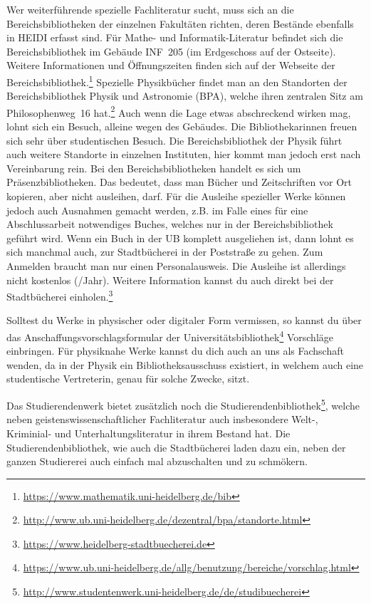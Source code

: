 Wer weiterführende spezielle Fachliteratur sucht, muss sich an die Bereichsbibliotheken der einzelnen Fakultäten richten, deren Bestände ebenfalls in \gls{HEIDI} erfasst sind. Für Mathe- und Informatik-Literatur befindet sich die Bereichsbibliothek im Gebäude \gls{INF}~205 (im Erdgeschoss auf der Ostseite). Weitere Informationen und Öffnungszeiten finden sich auf der Webseite der Bereichsbibliothek.\footnote{\url{https://www.mathematik.uni-heidelberg.de/bib}} Spezielle Physikbücher findet man an den Standorten der Bereichsbibliothek Physik und Astronomie (BPA), welche ihren zentralen Sitz am Philosophenweg~16 hat.\footnote{\url{http://www.ub.uni-heidelberg.de/dezentral/bpa/standorte.html}} Auch wenn die Lage etwas abschreckend wirken mag, lohnt sich ein Besuch, alleine wegen des Gebäudes. Die Bibliothekarinnen freuen sich sehr über studentischen Besuch. Die Bereichsbibliothek der Physik führt auch weitere Standorte in einzelnen Instituten, hier kommt man jedoch erst nach Vereinbarung rein.
Bei den Bereichsbibliotheken handelt es sich um Präsenzbibliotheken. Das bedeutet, dass man Bücher und Zeitschriften vor Ort kopieren, aber nicht ausleihen, darf. Für die Ausleihe spezieller Werke können jedoch auch Ausnahmen gemacht werden, z.B. im Falle eines für eine Abschlussarbeit notwendiges Buches, welches nur in der Bereichsbibliothek geführt wird.
Wenn ein Buch in der UB komplett ausgeliehen ist, dann lohnt es sich manchmal auch, zur Stadtbücherei in der Poststraße zu gehen. Zum Anmelden braucht man nur einen Personalausweis. Die Ausleihe ist allerdings nicht kostenlos (/Jahr). Weitere Information kannst du auch direkt bei der Stadtbücherei einholen.\footnote{\url{https://www.heidelberg-stadtbuecherei.de}}

Solltest du Werke in physischer oder digitaler Form vermissen, so kannst du über das Anschaffungsvorschlagsformular der Universitätsbibliothek\footnote{\url{https://www.ub.uni-heidelberg.de/allg/benutzung/bereiche/vorschlag.html}} Vorschläge einbringen. Für physiknahe Werke kannst du dich auch an uns als Fachschaft wenden, da in der Physik ein Bibliotheksausschuss existiert, in welchem auch eine studentische Vertreterin, genau für solche Zwecke, sitzt.


Das Studierendenwerk bietet zusätzlich noch die Studierendenbibliothek\footnote{\url{http://www.studentenwerk.uni-heidelberg.de/de/studibuecherei}}, welche neben geistenswissenschaftlicher Fachliteratur auch insbesondere Welt-, Kriminial- und Unterhaltungsliteratur in ihrem Bestand hat. Die Studierendenbibliothek, wie auch die Stadtbücherei laden dazu ein, neben der ganzen Studiererei auch einfach mal abzuschalten und zu schmökern.
